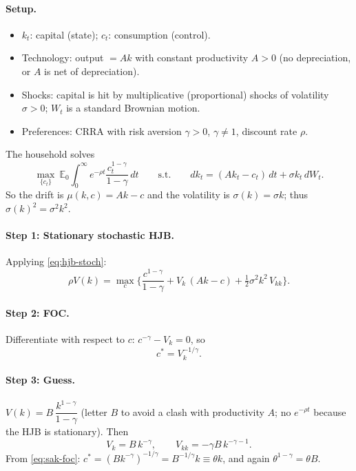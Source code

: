 \paragraph{Setup.}
\begin{itemize}
\item $k_t$: capital (state); $c_t$: consumption (control).
\item Technology: output $=Ak$ with constant productivity $A>0$ (no depreciation, or $A$ is net of depreciation).
\item Shocks: capital is hit by multiplicative (proportional) shocks of volatility $\sigma>0$; $W_t$ is a standard Brownian motion.
\item Preferences: CRRA with risk aversion $\gamma>0$, $\gamma\ne1$, discount rate $\rho$.
\end{itemize}
The household solves
\begin{equation}\label{eq:sak-problem}
\max_{\{c_t\}}\ \mathbb{E}_0\int_0^\infty e^{-\rho t}\frac{c_t^{1-\gamma}}{1-\gamma}\,dt\qquad\text{s.t.}\qquad dk_t=(Ak_t-c_t)\,dt+\sigma k_t\,dW_t.
\end{equation}
So the drift is $\mu(k,c)=Ak-c$ and the volatility is $\sigma(k)=\sigma k$; thus $\sigma(k)^2=\sigma^2k^2$.

\paragraph{Step 1: Stationary stochastic HJB.} Applying \eqref{eq:hjb-stoch}:
\begin{equation}\label{eq:sak-hjb}
\rho V(k)=\max_c\Big\{\frac{c^{1-\gamma}}{1-\gamma}+V_k\,(Ak-c)+\tfrac12\sigma^2k^2\,V_{kk}\Big\}.
\end{equation}

\paragraph{Step 2: FOC.} Differentiate with respect to $c$: $c^{-\gamma}-V_k=0$, so
\begin{equation}\label{eq:sak-foc}
c^*=V_k^{-1/\gamma}.
\end{equation}

\paragraph{Step 3: Guess.} $V(k)=B\,\dfrac{k^{1-\gamma}}{1-\gamma}$ (letter $B$ to avoid a clash with productivity $A$; no $e^{-\rho t}$ because the HJB is stationary). Then
\[
V_k=B\,k^{-\gamma},\qquad V_{kk}=-\gamma B\,k^{-\gamma-1}.
\]
From \eqref{eq:sak-foc}: $c^*=(Bk^{-\gamma})^{-1/\gamma}=B^{-1/\gamma}k\equiv\theta k$, and again $\theta^{1-\gamma}=\theta B$.

